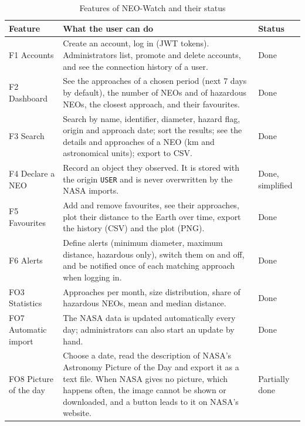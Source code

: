 \begin{table}[H]
  \centering
  \small
  \begin{tabularx}{\textwidth}{@{}l>{\raggedright\arraybackslash}X l@{}}
    \toprule
    \textbf{Feature} & \textbf{What the user can do} & \textbf{Status} \\
    \midrule
    F1 Accounts & Create an account, log in (JWT tokens). Administrators list, promote and delete
      accounts, and see the connection history of a user. & Done \\
    F2 Dashboard & See the approaches of a chosen period (next 7 days by default), the number of
      NEOs and of hazardous NEOs, the closest approach, and their favourites. & Done \\
    F3 Search & Search by name, identifier, diameter, hazard flag, origin and approach date; sort
      the results; see the details and approaches of a NEO (km and astronomical units); export
      to CSV. & Done \\
    F4 Declare a NEO & Record an object they observed. It is stored with the origin
      \texttt{USER} and is never overwritten by the NASA imports. & Done, simplified \\
    F5 Favourites & Add and remove favourites, see their approaches, plot their distance to the
      Earth over time, export the history (CSV) and the plot (PNG). & Done \\
    F6 Alerts & Define alerts (minimum diameter, maximum distance, hazardous only), switch them
      on and off, and be notified once of each matching approach when logging in. & Done \\
    FO3 Statistics & Approaches per month, size distribution, share of hazardous NEOs, mean
      and median distance. & Done \\
    FO7 Automatic import & The NASA data is updated automatically every day; administrators
      can also start an update by hand. & Done \\
    FO8 Picture of the day & Choose a date, read the description of NASA's Astronomy Picture of
      the Day and export it as a text file. When NASA gives no picture, which happens often, the
      image cannot be shown or downloaded, and a button leads to it on NASA's website. &
      Partially done \\
    \bottomrule
  \end{tabularx}
  \caption{Features of NEO-Watch and their status}
  \label{tab:features}
\end{table}

